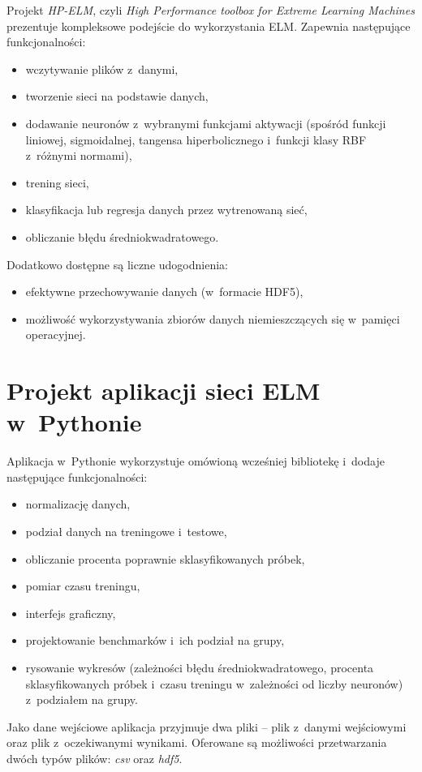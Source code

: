 \documentclass[pl]{minipw} %
\begin{document}
Projekt \textit{HP-ELM}, czyli \textit{High Performance toolbox for Extreme Learning Machines} prezentuje kompleksowe podejście do wykorzystania ELM. Zapewnia następujące funkcjonalności:
\begin{itemize}
\item wczytywanie plików z~danymi,
\item tworzenie sieci na podstawie danych,
\item dodawanie neuronów z~wybranymi funkcjami aktywacji (spośród funkcji liniowej, sigmoidalnej, tangensa hiperbolicznego i~funkcji klasy RBF z~różnymi normami),
\item trening sieci,
\item klasyfikacja lub regresja danych przez wytrenowaną sieć,
\item obliczanie błędu średniokwadratowego.
\end{itemize}
Dodatkowo dostępne są liczne udogodnienia:
\begin{itemize}
\item efektywne przechowywanie danych (w~formacie HDF5),
\item możliwość wykorzystywania zbiorów danych niemieszczących się w~pamięci operacyjnej.
\end{itemize}
\section{Projekt aplikacji sieci ELM w~Pythonie}
Aplikacja w~Pythonie wykorzystuje omówioną wcześniej bibliotekę i~dodaje następujące funkcjonalności:
\begin{itemize}
\item normalizację danych,
\item podział danych na treningowe i~testowe,
\item obliczanie procenta poprawnie sklasyfikowanych próbek,
\item pomiar czasu treningu,
\item interfejs graficzny,
\item projektowanie benchmarków i~ich podział na grupy,
\item rysowanie wykresów (zależności błędu średniokwadratowego, procenta sklasyfikowanych próbek i~czasu treningu w~zależności od liczby neuronów) z~podziałem na grupy.
\end{itemize}
Jako dane wejściowe aplikacja przyjmuje dwa pliki -- plik z~danymi wejściowymi oraz plik z~oczekiwanymi wynikami. Oferowane są możliwości przetwarzania dwóch typów plików: \textit{csv} oraz \textit{hdf5}. 
\end{document}
